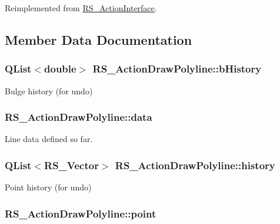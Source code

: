 Reimplemented from \hyperlink{classRS__ActionInterface_af1a8d898a8bf0521295d7c45d80e6d09}{R\-S\-\_\-\-Action\-Interface}.



\subsection{Member Data Documentation}
\hypertarget{classRS__ActionDrawPolyline_ab82053db77a74c54939e6256ebeed896}{
\subsubsection[{b\-History}]{\setlength{\rightskip}{0pt plus 5cm}Q\-List$<$double$>$ R\-S\-\_\-\-Action\-Draw\-Polyline\-::b\-History\hspace{0.3cm}{\ttfamily [protected]}}}\label{classRS__ActionDrawPolyline_ab82053db77a74c54939e6256ebeed896}
Bulge history (for undo) \hypertarget{classRS__ActionDrawPolyline_af1cec35c43a3f812826d75030b2ccd89}{
\subsubsection[{data}]{ R\-S\-\_\-\-Action\-Draw\-Polyline\-::data\hspace{0.3cm}{\ttfamily [protected]}}}\label{classRS__ActionDrawPolyline_af1cec35c43a3f812826d75030b2ccd89}
Line data defined so far. \hypertarget{classRS__ActionDrawPolyline_a06b67f7b5d7606785c4f0767c241aeed}{
\subsubsection[{history}]{\setlength{\rightskip}{0pt plus 5cm}Q\-List$<${\bf R\-S\-\_\-\-Vector}$>$ R\-S\-\_\-\-Action\-Draw\-Polyline\-::history\hspace{0.3cm}{\ttfamily [protected]}}}\label{classRS__ActionDrawPolyline_a06b67f7b5d7606785c4f0767c241aeed}
Point history (for undo) \hypertarget{classRS__ActionDrawPolyline_aaa0fcca41b31e393c3a77a5ba69e8201}{
\subsubsection[{point}]{ R\-S\-\_\-\-Action\-Draw\-Polyline\-::point\hspace{0.3cm}{\ttfamily [protected]}}}\label{classRS__ActionDrawPolyline_aaa0fcca41b31e393c3a77a5ba69e8201}
